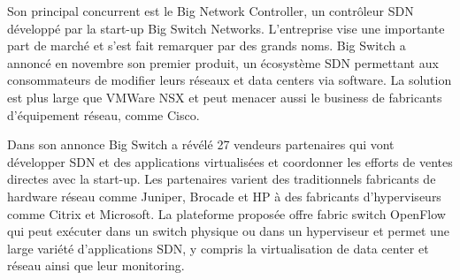 Son principal concurrent est le Big Network Controller, un contrôleur SDN développé par la start-up Big Switch Networks. L'entreprise vise une importante part de marché et s'est fait remarquer par des grands noms. Big Switch a annoncé en novembre son premier produit, un écosystème SDN permettant aux consommateurs de modifier leurs réseaux et data centers via software. La solution est plus large que VMWare NSX et peut menacer aussi le business de fabricants d'équipement réseau, comme Cisco. \cite{BigSwitchLaunchesFirst}


Dans son annonce Big Switch a révélé 27 vendeurs partenaires qui vont développer SDN et des applications virtualisées et coordonner les efforts de ventes directes avec la start-up. Les partenaires varient des traditionnels fabricants de hardware réseau comme Juniper, Brocade et HP à des fabricants d'hyperviseurs comme Citrix et Microsoft. La plateforme proposée offre \gls{fabric} switch OpenFlow qui peut exécuter dans un switch physique ou dans un hyperviseur et permet une large variété d'applications SDN, y compris la virtualisation de data center et réseau ainsi que leur monitoring. \cite{BigSwitchAnnouncement}




